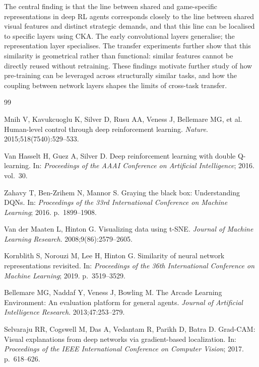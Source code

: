 \documentclass[a4paper]{article}
\begin{document}
The central finding is that the line between shared and game-specific representations in deep RL agents corresponds closely to the line between shared visual features and distinct strategic demands, and that this line can be localised to specific layers using CKA. The early convolutional layers generalise; the representation layer specialises. The transfer experiments further show that this similarity is geometrical rather than functional: similar features cannot be directly reused without retraining. These findings motivate further study of how pre-training can be leveraged across structurally similar tasks, and how the coupling between network layers shapes the limits of cross-task transfer.

\newpage
\begin{thebibliography}{99}

Mnih V, Kavukcuoglu K, Silver D, Rusu AA, Veness J, Bellemare MG, et al.
Human-level control through deep reinforcement learning.
\textit{Nature}. 2015;518(7540):529--533.

Van Hasselt H, Guez A, Silver D.
Deep reinforcement learning with double Q-learning.
In: \textit{Proceedings of the AAAI Conference on Artificial Intelligence}; 2016. vol.~30.

Zahavy T, Ben-Zrihem N, Mannor S.
Graying the black box: Understanding DQNs.
In: \textit{Proceedings of the 33rd International Conference on Machine Learning}; 2016. p.~1899--1908.

Van der Maaten L, Hinton G.
Visualizing data using t-SNE.
\textit{Journal of Machine Learning Research}. 2008;9(86):2579--2605.

Kornblith S, Norouzi M, Lee H, Hinton G.
Similarity of neural network representations revisited.
In: \textit{Proceedings of the 36th International Conference on Machine Learning}; 2019. p.~3519--3529.

Bellemare MG, Naddaf Y, Veness J, Bowling M.
The Arcade Learning Environment: An evaluation platform for general agents.
\textit{Journal of Artificial Intelligence Research}. 2013;47:253--279.

Selvaraju RR, Cogswell M, Das A, Vedantam R, Parikh D, Batra D.
Grad-CAM: Visual explanations from deep networks via gradient-based localization.
In: \textit{Proceedings of the IEEE International Conference on Computer Vision}; 2017. p.~618--626.


\end{thebibliography}
\end{document}
